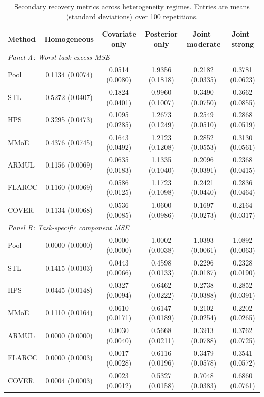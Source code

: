 \begin{table}[H]
\centering
\scriptsize
\setlength{\tabcolsep}{3.5pt}
\begin{tabular}{lccccc}
\toprule
Method & Homogeneous & Covariate only & Posterior only & Joint--moderate & Joint--strong \\
\midrule
\multicolumn{6}{l}{\textit{Panel A: Worst-task excess MSE}} \\
Pool & 0.1134 (0.0074) & 0.0514 (0.0080) & 1.9356 (0.1818) & 0.2182 (0.0335) & 0.3781 (0.0623) \\
STL & 0.5272 (0.0407) & 0.1824 (0.0401) & 0.9960 (0.1007) & 0.3490 (0.0750) & 0.3662 (0.0855) \\
HPS & 0.3295 (0.0473) & 0.1095 (0.0285) & 1.2673 (0.1249) & 0.2549 (0.0510) & 0.2868 (0.0519) \\
MMoE & 0.4376 (0.0745) & 0.1643 (0.0492) & 1.2123 (0.1208) & 0.2852 (0.0553) & 0.3130 (0.0561) \\
ARMUL & 0.1156 (0.0069) & 0.0635 (0.0183) & 1.1335 (0.1040) & 0.2096 (0.0391) & 0.2368 (0.0415) \\
FLARCC & 0.1160 (0.0069) & 0.0586 (0.0125) & 1.1723 (0.1098) & 0.2421 (0.0440) & 0.2836 (0.0464) \\
COVER & 0.1134 (0.0068) & 0.0536 (0.0085) & 1.0600 (0.0986) & 0.1697 (0.0273) & 0.2164 (0.0317) \\
\midrule
\multicolumn{6}{l}{\textit{Panel B: Task-specific component MSE}} \\
Pool & 0.0000 (0.0000) & 0.0000 (0.0000) & 1.0002 (0.0038) & 1.0393 (0.0061) & 1.0892 (0.0063) \\
STL & 0.1415 (0.0103) & 0.0443 (0.0066) & 0.4598 (0.0133) & 0.2296 (0.0187) & 0.2328 (0.0190) \\
HPS & 0.0445 (0.0148) & 0.0327 (0.0094) & 0.6462 (0.0222) & 0.2738 (0.0388) & 0.2852 (0.0391) \\
MMoE & 0.1110 (0.0164) & 0.0610 (0.0171) & 0.6147 (0.0189) & 0.2102 (0.0254) & 0.2202 (0.0265) \\
ARMUL & 0.0000 (0.0000) & 0.0030 (0.0040) & 0.5668 (0.0211) & 0.3913 (0.0788) & 0.3762 (0.0725) \\
FLARCC & 0.0000 (0.0003) & 0.0017 (0.0028) & 0.6116 (0.0196) & 0.3479 (0.0578) & 0.3541 (0.0572) \\
COVER & 0.0004 (0.0003) & 0.0023 (0.0012) & 0.5327 (0.0158) & 0.7048 (0.0383) & 0.6860 (0.0761) \\
\bottomrule
\end{tabular}
\caption{Secondary recovery metrics across heterogeneity regimes. Entries are means (standard deviations) over 100 repetitions.}
\label{tab:simulation-secondary}
\end{table}
